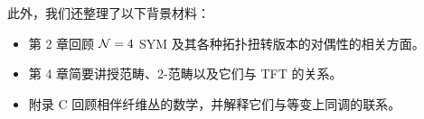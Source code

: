 此外，我们还整理了以下背景材料：


\begin{itemize}[leftmargin=1.8em,itemsep=3pt,topsep=3pt]
\item 第 2 章回顾 $\mathcal{N}=4$ SYM 及其各种拓扑扭转版本的对偶性的相关方面。
\item 第 4 章简要讲授范畴、2-范畴以及它们与 TFT 的关系。
\item 附录 C 回顾相伴纤维丛的数学，并解释它们与等变上同调的联系。
\end{itemize}

